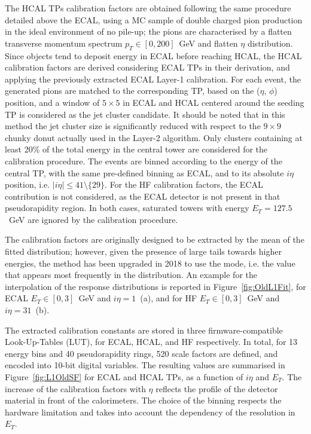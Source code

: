 The HCAL TPs calibration factors are obtained following the same procedure detailed above the ECAL, using a MC sample of double charged pion production in the ideal environment of no pile-up; the pions are characterised by a flatten transverse momentum spectrum $p_T\in[0,200]$~GeV and flatten $\eta$ distribution.
Since objects tend to deposit energy in ECAL before reaching HCAL, the HCAL calibration factors are derived considering ECAL TPs in their derivation, and applying the previously extracted ECAL Layer-1 calibration.
For each event, the generated pions are matched to the corresponding TP, based on the ($\eta$, $\phi$) position, and a window of $5\times5$ in ECAL and HCAL centered around the seeding TP is considered as the jet cluster candidate.
It should be noted that in this method the jet cluster size is significantly reduced with respect to the $9\times9$ chunky donut actually used in the Layer-2 algorithm.
Only clusters containing at least 20\% of the total energy in the central tower are considered for the calibration procedure.
The events are binned according to the energy of the central TP, with the same pre-defined binning as ECAL, and to its absolute $i\eta$ position, i.e. $|i\eta|\leq41 \setminus \{29\}$.
For the HF calibration factors, the ECAL contribution is not considered, as the ECAL detector is not present in that pseudorapidity region.
In both cases, saturated towers with energy $E_T=127.5$~GeV are ignored by the calibration procedure. 

The calibration factors are originally designed to be extracted by the mean of the fitted distribution; however, given the presence of large tails towards higher energies, the method has been upgraded in 2018 to use the mode, i.e. the value that appears most frequently in the distribution.
An example for the interpolation of the response distributions is reported in Figure~\ref{fig:OldL1Fit}, for ECAL $E_T \in [0,3]$~GeV and $i\eta=1$~(a), and for HF $E_T \in [0,3]$~GeV and $i\eta=31$~(b).

The extracted calibration constants are stored in three firmware-compatible Look-Up-Tables (LUT), for ECAL, HCAL, and HF respectively. In total, for 13 energy bins and 40 pseudorapidity rings, 520 scale factors are defined, and encoded into 10-bit digital variables.
The resulting values are summarised in Figure~\ref{fig:L1OldSF} for ECAL and HCAL TPs, as a function of $i\eta$ and $E_T$.
The increase of the calibration factors with $\eta$ reflects the profile of the detector material in front of the calorimeters. The choice of the binning respects the hardware limitation and takes into account the dependency of the resolution in $E_T$.


